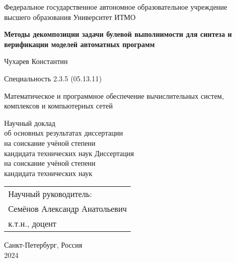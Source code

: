 \thispagestyle{empty}

\begin{center}
    Федеральное государственное автономное образовательное учреждение \\
    высшего образования Университет ИТМО
\end{center}

\vspace{0pt plus2fill}

\begin{center}

\textbf{\large
Методы декомпозиции задачи булевой выполнимости для синтеза и верификации моделей автоматных программ
}

\vspace{1cm}

{\large
    Чухарев Константин
}

\vspace{1cm}

Специальность 2.3.5 (05.13.11)
\begin{SingleSpace*}
    \small
    Математическое и программное обеспечение вычислительных систем, \\
    комплексов и компьютерных сетей
\end{SingleSpace*}

\vspace{1cm}

\ifsynopsis
Научный доклад \\
об основных результатах диссертации \\
на соискание учёной степени \\
кандидата технических наук
\else
Диссертация \\
на соискание учёной степени \\
кандидата технических наук
\fi

\end{center}

\vspace{0pt plus1fill}

\hfill\begin{tabular}{l}
Научный руководитель: \\
Семёнов Александр Анатольевич \\
к.т.н., доцент
\end{tabular}

\vspace{0pt plus1fill}

\begin{center}
    Санкт-Петербург, Россия \\
    2024
\end{center}
